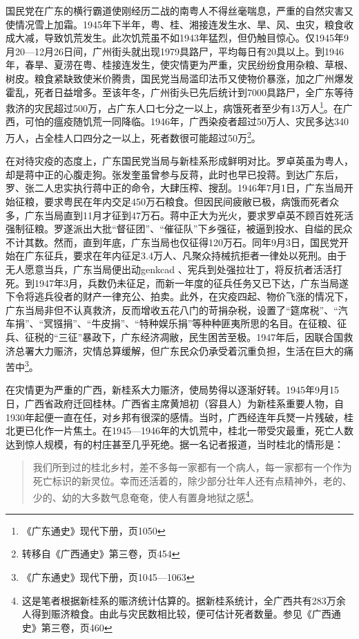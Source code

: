 国民党在广东的横行霸道使刚经历二战的南粤人不得丝毫喘息，严重的自然灾害又使情况雪上加霜。1945年下半年，粤、桂、湘接连发生水、旱、风、虫灾，粮食收成大减，导致饥荒发生。此次饥荒虽不如1943年猛烈，但仍触目惊心。仅1945年9月20—12月26日间，广州街头就出现1979具路尸，平均每日有20具以上。到1946年，春旱、夏涝在粤、桂接连发生，使灾情更为严重，灾民纷纷食用杂粮、草根、树皮。粮食紧缺致使米价腾贵，国民党当局滥印法币又使物价暴涨，加之广州爆发霍乱，死者日益增多。至该年冬，广州街头已先后统计到7000具路尸，全广东等待救济的灾民超过500万，占广东人口七分之一以上，病饿死者至少有13万人\footnote{《广东通史》现代下册，页1050}。在广西，可怕的瘟疫随饥荒一同降临。1946年，广西染疫者超过50万人、灾民多达340万人，占全桂人口四分之一以上，死者数很可能超过50万\footnote{转移自《广西通史》第三卷，页454}。

在对待灾疫的态度上，广东国民党当局与新桂系形成鲜明对比。罗卓英虽为粤人，却是蒋中正的心腹走狗。张发奎虽曾参与反蒋，此时也早已投蒋。到达广东后，罗、张二人忠实执行蒋中正的命令，大肆压榨、搜刮。1946年7月1日，广东当局开始征粮，要求粤民在年内交足450万石粮食。但因民间疲敝已极，病饿而死者众多，广东当局直到11月才征到47万石。蒋中正大为光火，要求罗卓英不顾百姓死活强制征粮。罗遂派出大批“督征团”、“催征队”下乡强征，被逼到投水、自缢的民众不计其数。然而，直到年底，广东当局也仅征得120万石。同年9月3日，国民党开始在广东征兵，要求在年内征足3.4万人、凡聚众持械抗拒者一律处以死刑。由于无人愿意当兵，广东当局便出动genkcad 、宪兵到处强拉壮丁，将反抗者活活打死。到1947年3月，兵数仍未征足，而新一年度的征兵任务又已下达，广东当局遂下令将逃兵役者的财产一律充公、拍卖。此外，在灾疫四起、物价飞涨的情况下，广东当局非但不认真救济，反而增收五花八门的苛捐杂税，设置了“筵席税”、“汽车捐”、“冥镪捐”、“牛皮捐”、“特种娱乐捐”等种种匪夷所思的名目。在征粮、征兵、征税的“三征”暴政下，广东经济凋敝，民生困苦至极。1947年后，因联合国救济总署大力赈济，灾情总算缓解，但广东民众仍承受着沉重负担，生活在巨大的痛苦中\footnote{《广东通史》现代下册，页1045—1063}。

在灾情更为严重的广西，新桂系大力赈济，使局势得以逐渐好转。1945年9月15日，广西省政府迁回桂林。广西省主席黄旭初（容县人）为新桂系重要人物，自1930年起便一直在任，对乡邦有很深的感情。当时，广西经连年兵燹一片残破，桂北更已化作一片焦土。在1945—1946年的大饥荒中，桂北一带受灾最重，死亡人数达到惊人规模，有的村庄甚至几乎死绝。据一名记者报道，当时桂北的情形是：

\begin{quote}

我们所到过的桂北乡村，差不多每一家都有一个病人，每一家都有一个作为死亡标识的新灵位。幸而还活着的，除少部分壮年人还有点精神外，老的、少的、幼的大多数气息奄奄，使人有置身地狱之感\footnote{这是笔者根据新桂系的赈济统计估算的。据新桂系统计，全广西共有283万余人得到赈济粮食。由此与灾民数相比较，便可估计死者数量。参见《广西通史》第三卷，页460}。

\end{quote}

